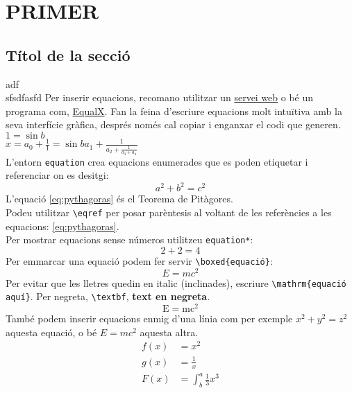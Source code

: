 \chapter{PRIMER}
\section{Títol de la secció}
adf\\
\newline
sfsdfasfd
Per inserir equacions, recomano utilitzar un \href{https://www.codecogs.com/latex/eqneditor.php}{servei web} o bé un programa com, \href{https://www.codecogs.com/latex/eqneditor.php}{EqualX}. Fan la feina d'escriure equacions molt intuïtiva amb la seva interfície gràfica, després només cal copiar i enganxar el codi que generen. \\
$1=\sin b$\\
$x = a_0 + \frac{1}1=\sin b{a_1 + \frac{1}{a_2 + \frac{1}{a_3 + a_4}}}$\\
L'entorn \verb|equation| crea equacions enumerades que es poden etiquetar i referenciar on es desitgi:
\begin{equation}\label{eq:pythagoras}
a^2 + b^2 = c^2
\end{equation}
L'equació \ref{eq:pythagoras} és el Teorema de Pitàgores.\\
Podeu utilitzar \verb|\eqref| per posar parèntesis al voltant de les referències a les equacions: \eqref{eq:pythagoras}.
%
\\Per mostrar equacions sense números utilitzeu \verb|equation*|:
%
\begin{equation}\label{eq:suma}
2 + 2 = 4 
\end{equation}
Per emmarcar una equació podem fer servir \verb|\boxed{equació}|:
\begin{equation*}
\boxed{E=mc^2}
\end{equation*}
Per evitar que les lletres quedin en italic (inclinades), escriure \verb|\mathrm{equació aquí}|. Per negreta, \verb|\textbf|, \textbf{text en negreta}.
\begin{equation*}
\mathrm{E=mc^2}
\end{equation*}
%
%
També podem inserir equacions enmig d'una línia com per exemple \(x^2 + y^2 = z^2\) aquesta equació, o bé $E=mc^2$ aquesta altra.
\begin{align*}
  f(x) &= x^2\\
  g(x) &= \frac{1}{x}\\
  F(x) &= \int^a_b \frac{1}{3}x^3
\end{align*}

